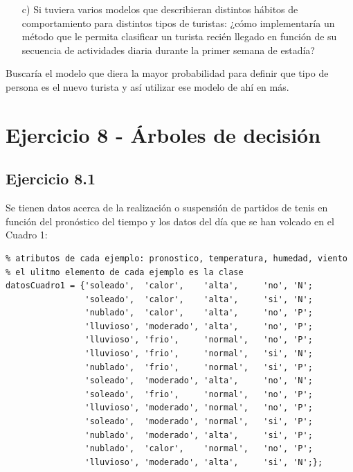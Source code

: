 \documentclass[11pt,a4paper,final]{article}
\begin{document}

\begin{itemize}
   \item[c)] Si tuviera varios modelos que describieran distintos hábitos de comportamiento para distintos tipos de turistas: ¿cómo implementaría un método que le permita clasificar un turista recién llegado en función de su secuencia de actividades diaria durante la primer semana de estadía?
\end{itemize}

Buscaría el modelo que diera la mayor probabilidad para definir que tipo de persona es el nuevo turista y así utilizar ese modelo de ahí en más.






























\clearpage


\section{Ejercicio 8 - Árboles de decisión}


\subsection{Ejercicio 8.1}

Se tienen datos acerca de la realización o suspensión de partidos de tenis en función del pronóstico del tiempo y los datos del día que se han volcado en el Cuadro 1:

\begin{verbatim}
% atributos de cada ejemplo: pronostico, temperatura, humedad, viento
% el ulitmo elemento de cada ejemplo es la clase
datosCuadro1 = {'soleado',  'calor',    'alta',     'no', 'N';
                'soleado',  'calor',    'alta',     'si', 'N';
                'nublado',  'calor',    'alta',     'no', 'P';
                'lluvioso', 'moderado', 'alta',     'no', 'P';
                'lluvioso', 'frio',     'normal',   'no', 'P';
                'lluvioso', 'frio',     'normal',   'si', 'N';
                'nublado',  'frio',     'normal',   'si', 'P';
                'soleado',  'moderado', 'alta',     'no', 'N';
                'soleado',  'frio',     'normal',   'no', 'P';
                'lluvioso', 'moderado', 'normal',   'no', 'P';
                'soleado',  'moderado', 'normal',   'si', 'P';
                'nublado',  'moderado', 'alta',     'si', 'P';
                'nublado',  'calor',    'normal',   'no', 'P';
                'lluvioso', 'moderado', 'alta',     'si', 'N';};
\end{verbatim}
\end{document}
